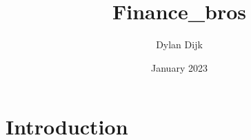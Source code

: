 \documentclass{article}
\title{Finance_bros}
\author{Dylan Dijk}
\date{January 2023}
\begin{document}
\maketitle

\section{Introduction}
\end{document}
